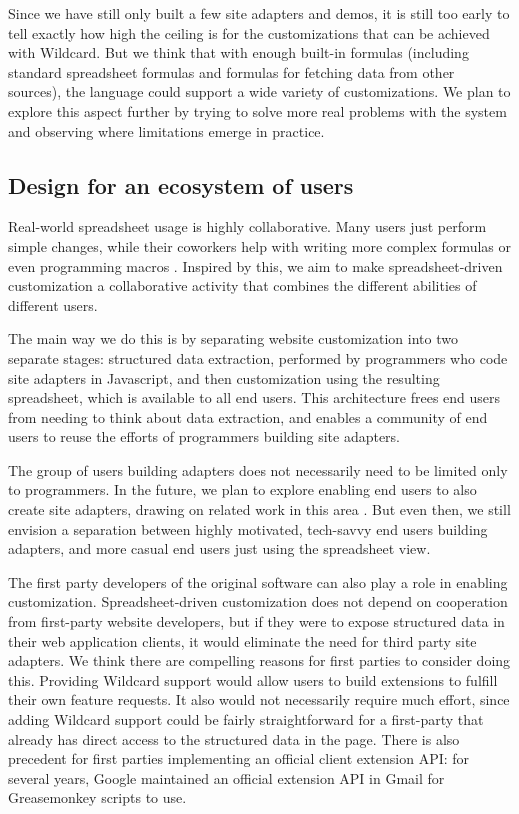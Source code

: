 \documentclass[english,submission]{programming}
\begin{document}
Since we have still only built a few site adapters and demos, it is
still too early to tell exactly how high the ceiling is for the
customizations that can be achieved with Wildcard. But we think that
with enough built-in formulas (including standard spreadsheet formulas
and formulas for fetching data from other sources), the language could
support a wide variety of customizations. We plan to explore this aspect
further by trying to solve more real problems with the system and
observing where limitations emerge in practice.

\hypertarget{design-for-an-ecosystem-of-users}{%
\subsection{Design for an ecosystem of
users}\label{design-for-an-ecosystem-of-users}}

Real-world spreadsheet usage is highly collaborative. Many users just
perform simple changes, while their coworkers help with writing more
complex formulas or even programming macros \autocite{nardi1990}.
Inspired by this, we aim to make spreadsheet-driven customization a
collaborative activity that combines the different abilities of
different users.

The main way we do this is by separating website customization into two
separate stages: structured data extraction, performed by programmers
who code site adapters in Javascript, and then customization using the
resulting spreadsheet, which is available to all end users. This
architecture frees end users from needing to think about data
extraction, and enables a community of end users to reuse the efforts of
programmers building site adapters.

The group of users building adapters does not necessarily need to be
limited only to programmers. In the future, we plan to explore enabling
end users to also create site adapters, drawing on related work in this
area \autocite{chasins2018,huynh2006}. But even then, we still envision
a separation between highly motivated, tech-savvy end users building
adapters, and more casual end users just using the spreadsheet view.

The first party developers of the original software can also play a role
in enabling customization. Spreadsheet-driven customization does not
depend on cooperation from first-party website developers, but if they
were to expose structured data in their web application clients, it
would eliminate the need for third party site adapters. We think there
are compelling reasons for first parties to consider doing this.
Providing Wildcard support would allow users to build extensions to
fulfill their own feature requests. It also would not necessarily
require much effort, since adding Wildcard support could be fairly
straightforward for a first-party that already has direct access to the
structured data in the page. There is also precedent for first parties
implementing an official client extension API: for several years, Google
maintained an official extension API in Gmail for Greasemonkey scripts
to use.
\end{document}
